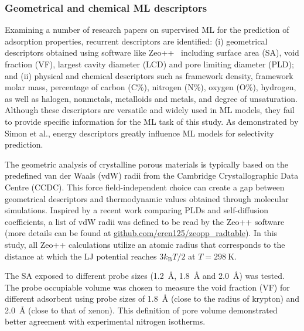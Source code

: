 \documentclass[main]{subfiles}
\begin{document}
\subsubsection{Geometrical and chemical ML descriptors}

Examining a number of research papers on supervised ML for the prediction of adsorption properties,\autocite{Fernandez_2013,Simon_2015,Fanourgakis_2020,Anderson_2020,Pardakhti_2020} recurrent descriptors are identified: (i) geometrical descriptors obtained using software like Zeo++~\autocite{zeopp_Willems2012} including surface area (SA), void fraction (VF), largest cavity diameter (LCD) and pore limiting diameter (PLD); and (ii) physical and chemical descriptors such as framework density, framework molar mass, percentage of carbon (C\%), nitrogen (N\%), oxygen (O\%), hydrogen, as well as halogen, nonmetals, metalloids and metals, and degree of unsaturation. Although these descriptors are versatile and widely used in ML models, they fail to provide specific information for the ML task of this study. As demonstrated by Simon et al., energy descriptors greatly influence ML models for selectivity prediction.

The geometric analysis of crystalline porous materials is typically based on the predefined van der Waals (vdW) radii from the Cambridge Crystallographic Data Centre (CCDC). This force field-independent choice can create a gap between geometrical descriptors and thermodynamic values obtained through molecular simulations. Inspired by a recent work comparing PLDs and self-diffusion coefficients,\autocite{Hung_2021} a list of vdW radii was defined to be read by the Zeo++ software (more details can be found at \url{github.com/eren125/zeopp_radtable}). In this study, all Zeo++ calculations utilize an atomic radius that corresponds to the distance at which the LJ potential reaches $3 k_\text{B} T/2$ at $T = \SI{298}{\kelvin}$.

The SA exposed to different probe sizes (\SI{1.2}{\angstrom}, \SI{1.8}{\angstrom} and \SI{2.0}{\angstrom}) was tested. The probe occupiable volume was chosen to measure the void fraction (VF) for different adsorbent using probe sizes of \SI{1.8}{\angstrom} (close to the radius of krypton) and \SI{2.0}{\angstrom} (close to that of xenon). This definition of pore volume demonstrated better agreement with experimental nitrogen isotherms.\autocite{vol_Ongari2017}
\end{document}

